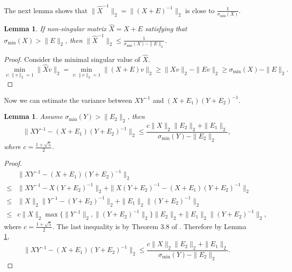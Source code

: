\documentclass[english]{article} %
\providecommand{\lemmaname}{Lemma}
\providecommand{\lemmaname}{Lemma}
\theoremstyle{plain}
\theoremstyle{remark}
\theoremstyle{claim}
\theoremstyle{plain}
\newtheorem{lemma}[thm]{\protect\lemmaname}
\begin{document}
The next lemma shows that $\|\widehat{X}^{-1}\|_2 = \|(X+E)^{-1}\|_2$ is close to $\frac{1}{\sigma_{\min}(X)}$.

\begin{lemma}
\label{lem:inversevariation}
If non-singular matrix $\widehat{X} = X+E$ satisfying that $\sigma_{\min}(X)>\|E\|_2$, then  $\|\widehat{X}^{-1}\|_2 \le \frac{1}{\sigma_{\min}(X)-\|E\|_2}$.
\end{lemma} 
\begin{proof}
Consider the minimal singular value of $\widehat{X}$. 
\[
 \min_{v:\|v\|_2=1} \|\widehat{X}v\|_2 = \min_{v:\|v\|_2=1}\|(X+E)v\|_2 \ge \|Xv\|_2 - \|Ev\|_2 \ge \sigma_{\min}(X) - \|E\|_2.
\]
\end{proof}

Now we can estimate the variance between $XY^{-1}$ and $(X+E_1)(Y+E_2)^{-1}$.
\begin{lemma}
\label{lem:Mvariation}
Assume $\sigma_{\min}(Y) > \|E_2\|_2$, then 
\[
\| XY^{-1} - (X+E_1)(Y+E_2)^{-1}\|_2 \le \frac{c\|X\|_2\|E_2\|_2+\|E_1\|_2}{\sigma_{\min}(Y) - \|E_2\|_2},
\]
where $c = \frac{1+\sqrt{5}}{2}$.
\end{lemma}
\begin{proof}

\begin{align*}
	& \| XY^{-1} - (X+E_1)(Y+E_2)^{-1}\|_2 \\
\le & \| XY^{-1} - X(Y+E_2)^{-1}\|_2 + \| X(Y+E_2)^{-1} - (X+E_1)(Y+E_2)^{-1}\|_2 \\
\le & \|X\|_2\| Y^{-1} - (Y+E_2)^{-1}\|_2 + \| E_1\|_2 \|(Y+E_2)^{-1}\|_2 \\
\le & c \|X\|_2 \max\{\| Y^{-1}\|_2 , \|(Y+E_2)^{-1}\|_2\} \|E_2\|_2 + \| E_1\|_2 \|(Y+E_2)^{-1}\|_2,
\end{align*}
where $c = \frac{1+\sqrt{5}}{2}$. The last inequality is by Theorem 3.8 of \citep*{stewart1990matrix}. Therefore by Lemma \ref{lem:inversevariation},
\[
\| XY^{-1} - (X+E_1)(Y+E_2)^{-1}\|_2 \le \frac{c\|X\|_2\|E_2\|_2+\|E_1\|_2}{\sigma_{\min}(Y) - \|E_2\|_2}.
\]
\end{proof}
\end{document}
